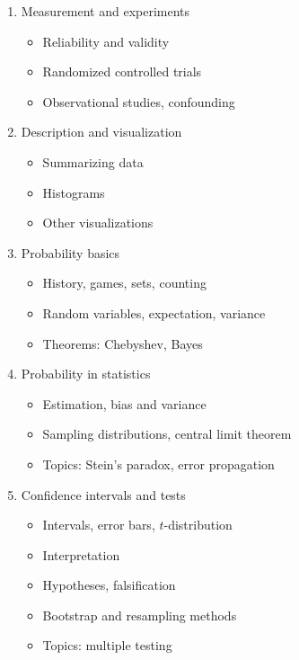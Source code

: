 \documentclass[11pt]{article}
\begin{document}
\begin{enumerate}
\item Measurement and experiments

  \begin{itemize}
  \item Reliability and validity
  \item Randomized controlled trials
  \item Observational studies, confounding
  \end{itemize}
  
\item Description and visualization

  \begin{itemize}
  \item Summarizing data
  \item Histograms
  \item Other visualizations
  \end{itemize}
  
\item Probability basics

  \begin{itemize}
  \item History, games, sets, counting
  \item Random variables, expectation, variance
  \item Theorems: Chebyshev, Bayes
  \end{itemize}
  
\item Probability in statistics

  \begin{itemize}
  \item Estimation, bias and variance
  \item Sampling distributions, central limit theorem
  \item Topics: Stein's paradox, error propagation
  \end{itemize}
  
\item Confidence intervals and tests

  \begin{itemize}
  \item Intervals, error bars, $t$-distribution
  \item Interpretation
  \item Hypotheses, falsification
  \item Bootstrap and resampling methods
  \item Topics: multiple testing
  \end{itemize}
  

\end{enumerate}
\end{document}
